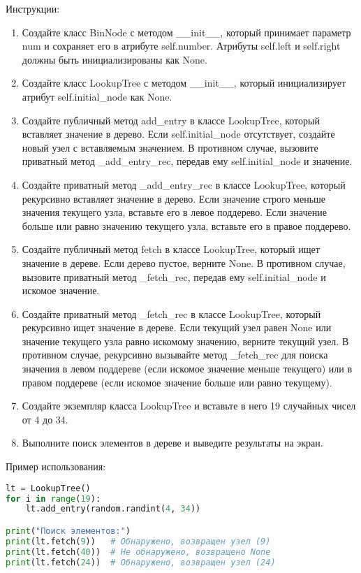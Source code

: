 \begin{enumerate}
Инструкции:
\begin{enumerate}
    \item Создайте класс BinNode с методом \_\_init\_\_, который принимает параметр num и сохраняет его в атрибуте self.number. Атрибуты self.left и self.right должны быть инициализированы как None.
    \item Создайте класс LookupTree с методом \_\_init\_\_, который инициализирует атрибут self.initial\_node как None.
    \item Создайте публичный метод add\_entry в классе LookupTree, который вставляет значение в дерево. Если self.initial\_node отсутствует, создайте новый узел с вставляемым значением. В противном случае, вызовите приватный метод \_add\_entry\_rec, передав ему self.initial\_node и значение.
    \item Создайте приватный метод \_add\_entry\_rec в классе LookupTree, который рекурсивно вставляет значение в дерево. Если значение строго меньше значения текущего узла, вставьте его в левое поддерево. Если значение больше или равно значению текущего узла, вставьте его в правое поддерево.
    \item Создайте публичный метод fetch в классе LookupTree, который ищет значение в дереве. Если дерево пустое, верните None. В противном случае, вызовите приватный метод \_fetch\_rec, передав ему self.initial\_node и искомое значение.
    \item Создайте приватный метод \_fetch\_rec в классе LookupTree, который рекурсивно ищет значение в дереве. Если текущий узел равен None или значение текущего узла равно искомому значению, верните текущий узел. В противном случае, рекурсивно вызывайте метод \_fetch\_rec для поиска значения в левом поддереве (если искомое значение меньше текущего) или в правом поддереве (если искомое значение больше или равно текущему).
    \item Создайте экземпляр класса LookupTree и вставьте в него 19 случайных чисел от 4 до 34.
    \item Выполните поиск элементов в дереве и выведите результаты на экран.
\end{enumerate}

Пример использования:
\begin{lstlisting}[language=Python]
lt = LookupTree()
for i in range(19):
    lt.add_entry(random.randint(4, 34))

print("Поиск элементов:")
print(lt.fetch(9))   # Обнаружено, возвращен узел (9)
print(lt.fetch(40))  # Не обнаружено, возвращено None
print(lt.fetch(24))  # Обнаружено, возвращен узел (24)
\end{lstlisting}


\end{enumerate}
